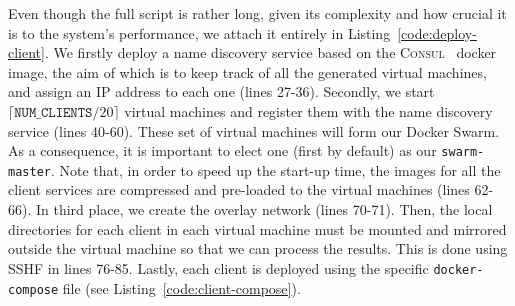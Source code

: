 Even though the full script is rather long, given its complexity and how crucial it is to the system's performance, we attach it entirely in Listing~\ref{code:deploy-client}.
We firstly deploy a name discovery service based on the \textsc{Consul}~\cite{consul-image} docker image, the aim of which is to keep track of all the generated virtual machines, and assign an IP address to each one (lines 27-36).
Secondly, we start $\lceil \texttt{NUM\_CLIENTS} / 20 \rceil$ virtual machines and register them with the name discovery service (lines 40-60).
These set of virtual machines will form our Docker Swarm. As a consequence, it is important to elect one (first by default) as our \texttt{swarm-master}.
Note that, in order to speed up the start-up time, the images for all the client services are compressed and pre-loaded to the virtual machines (lines 62-66).
In third place, we create the overlay network (lines 70-71).
Then, the local directories for each client in each virtual machine must be mounted and mirrored outside the virtual machine so that we can process the results.
This is done using SSHF in lines 76-85.
Lastly, each client is deployed using the specific \texttt{docker-compose} file (see Listing~\ref{code:client-compose}).
